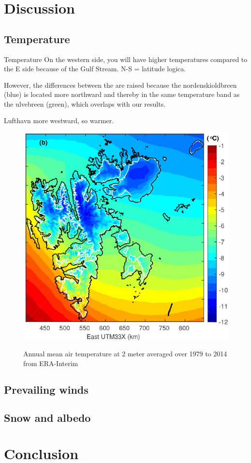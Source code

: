 \documentclass[11pt]{report}
\begin{document}
\chapter{Discussion}\label{sec:discussion}

\section{Temperature}\label{sec:Tdisc}
Temperature
On the western side, you will have higher temperatures compared to the E side because of the Gulf Stream. 
N-S = latitude logica.

However, the differences between the are raised because the nordenskioldbreen (blue) is located more northward and thereby in the same temperature band as the ulvebreen (green), which overlaps with our results.

Lufthavn more westward, so warmer. 


\begin{figure}[h]
\includegraphics[scale=1, width=0.5 \textwidth]{ostby.jpg}
\cite{osby}
\caption{Annual mean air temperature at 2 meter averaged over 1979 to 2014 from ERA-Interim}
\label{fig:trossby}
\end{figure}

\section{Prevailing winds}\label{sec:pw}

\section{Snow and albedo}\label{sec:sa}



\chapter{Conclusion}\label{sec:conclusion}
\end{document}
